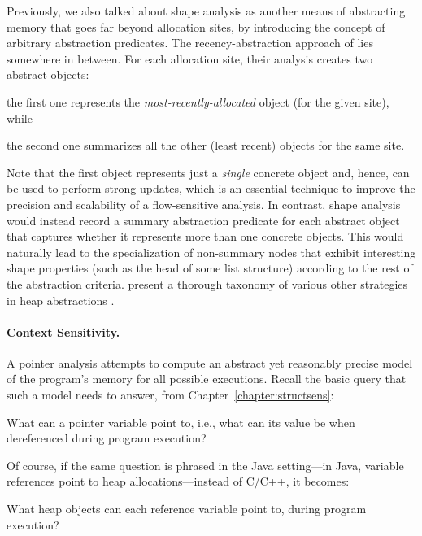 Previously, we also talked about shape analysis
\cite{toplas/SagivRW02,popl/SagivRW99,toplas/SagivRW98} as another
means of abstracting memory that goes far beyond allocation sites, by
introducing the concept of arbitrary abstraction predicates. The
recency-abstraction approach of \citeauthor{sas/BalakrishnanR06}
\cite{sas/BalakrishnanR06} lies somewhere in between. For each
allocation site, their analysis creates two abstract objects:
\begin{inparaenum}[(i)]
\item the first one represents the \emph{most-recently-allocated}
  object (for the given site), while
\item the second one summarizes all the other (least recent)
  objects for the same site.
\end{inparaenum}
Note that the first object represents just a \emph{single} concrete
object and, hence, can be used to perform strong updates, which is an
essential technique to improve the precision and scalability of a
flow-sensitive analysis.
%
In contrast, shape analysis would instead record a summary abstraction
predicate for each abstract object that captures whether it represents
more than one concrete objects. This would naturally lead to the
specialization of non-summary nodes that exhibit interesting shape
properties (such as the head of some list structure) according to the
rest of the abstraction criteria.
%
\citeauthor{journals/corr/KanvarK14} present a thorough taxonomy of
various other strategies in heap abstractions
\cite{journals/corr/KanvarK14}.



\paragraph{Context Sensitivity.}

A pointer analysis attempts to compute an abstract yet reasonably
precise model of the program's memory for all possible
executions. Recall the basic query that such a model needs to answer,
from Chapter~\ref{chapter:structsens}:
\begin{displayquote}
  What can a pointer variable point to, i.e., what can its value be
  when dereferenced during program execution?
\end{displayquote}
Of course, if the same question is phrased in the Java setting---in
Java, variable references point to heap allocations---instead of
C/C++, it becomes:
\begin{displayquote}
  What heap objects can each reference variable point to, during
  program execution?
\end{displayquote}

